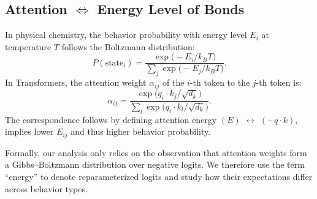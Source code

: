 \subsection{Attention $\Leftrightarrow $ Energy Level of Bonds}
In physical chemistry, the behavior probability with energy level $E_i$ at temperature \(T\) follows the Boltzmann distribution:
\begin{equation}
    P(\text{state}_i) = \frac{\exp\!\big(-E_i / k_B T\big)}{\sum_j {\exp\!\big(-E_j / k_B T\big)}}.
    \label{eq:energy}
\end{equation}
In Transformers, the attention weight \(\alpha_{ij}\) of the \(i\)-th token to the \(j\)-th token is:
\begin{equation}
\alpha_{ij} = \frac{\exp\!\big(q_i \cdot k_j / \sqrt{d_k}\big)}{\sum_l \exp\!\big(q_i \cdot k_l / \sqrt{d_k}\big)}.
\end{equation}
The correspondence follows by defining attention energy \((E)\) \(\leftrightarrow\) \(( - q \cdot k )\), implies lower $E_{ij}$ and thus higher behavior probability.

Formally, our analysis only relies on the observation that attention weights form a Gibbs–Boltzmann distribution over negative logits. We therefore use the term “energy” to denote reparameterized logits and study how their expectations differ across behavior types. 


